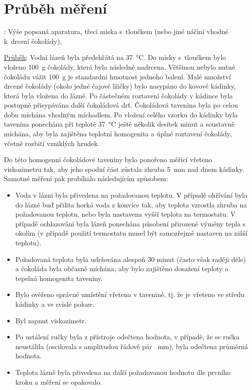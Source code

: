 \documentclass[12pt]{article}
\begin{document}
\section{Průběh měření}
\underline{}: Výše popsaná aparatura, třecí miska s~tloučkem (nebo jiné náčiní vhodné k~drcení čokolády), 
\par \underline{Průběh}: Vodní lázeň byla předehřátá na \SI{37}{\degreeCelsius}. Do misky s~tloučkem bylo vloženo \SI{100}{\gram} čokolády, která byla následně nadrcena. Většinou nebylo nutné čokoládu vážit \textendash \! \SI{100}{\gram} je standardní hmotnost jednoho balení. Malé množství drcené čokolády (okolo jedné čajové lžičky) bylo nasypáno do kovové kádinky, která byla vložena do lázně. Po částečném roztavení čokolády v kádince byla postupně přisypávána další čokoládová drť. Čokoládová tavenina byla po celou dobu míchána vhodným míchadlem. Po vložení celého vzorku do kádinky byla tavenina ponechána při teplotě \SI{37}{\degreeCelsius} ještě několik desítek minut a soustavně míchána, aby byla zajištěna teplotní homogenita a úplné roztavení čokolády, včetně rozbití vzniklých hrudek.
\par
Do této homogenní čokoládové taveniny bylo ponořeno měřicí vřeteno viskozimetru tak, aby jeho spodní část zůstala zhruba \SI{5}{\milli\metre} nad dnem kádinky. Samotné měření pak probíhalo následujícím způsobem:
\begin{itemize}[noitemsep, topsep = 0pt]
    \item Voda v lázni byla přivedena na požadovanou teplotu. V případě ohřívání byla do lázně buď přilita horká voda z konvice tak, aby teplota vzrostla zhruba na požadovanou teplotu, nebo byla nastavena vyšší teplota na termostatu. V případě ochlazování byla lázeň ponechána působení přirozené výměny tepla s okolím (v případě použití termostatu musel být samozřejmě nastaven na nižší teplotu).
    \item Požadovaná teplota byla udržována alespoň 30 minut (často však raději déle) a čokoláda byla občasně míchána, aby bylo zajištěno dosažení teploty a tepelná homogenita taveniny.
    \item Bylo ověřeno správné umístění vřetena v tavenině, tj. že je vřeteno ve středu kádinky a ve svislé poloze.
    \item Byl zapnut viskozimetr.
    \item Po ustálení ručky byla z přístroje odečtena hodnota, v případě, že se ručka neustálila (oscilovala s amplitudou řádově pár \SI{}{\milli\metre}), byla odečtena průměrná hodnota.
    \item Teplota lázně byla přivedena na další požadovanou hodnotu dle prvního kroku a měření se opakovalo.
\end{itemize}
\end{document}
